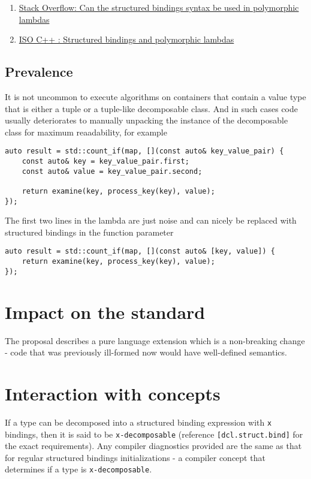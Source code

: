 \documentclass{article}
\begin{document}
\begin{enumerate}
    \item \href{https://stackoverflow.com/questions/45541334}{Stack Overflow:
        Can the structured bindings syntax be used in polymorphic lambdas}
    \item \href{https://goo.gl/fRSwNg}{ISO C++ : Structured bindings and
        polymorphic lambdas}
\end{enumerate}

\subsection{Prevalence}
It is not uncommon to execute algorithms on containers that contain a value
type that is either a tuple or a tuple-like decomposable class.  And in such
cases code usually deteriorates to manually unpacking the instance of the
decomposable class for maximum reaadability, for example

\begin{lstlisting}
auto result = std::count_if(map, [](const auto& key_value_pair) {
    const auto& key = key_value_pair.first;
    const auto& value = key_value_pair.second;

    return examine(key, process_key(key), value);
});
\end{lstlisting}

The first two lines in the lambda are just noise and can nicely be replaced
with structured bindings in the function parameter

\begin{lstlisting}
auto result = std::count_if(map, [](const auto& [key, value]) {
    return examine(key, process_key(key), value);
});
\end{lstlisting}


\section{Impact on the standard}
The proposal describes a pure language extension which is a non-breaking
change - code that was previously ill-formed now would have well-defined
semantics.


\section{Interaction with concepts}
If a type can be decomposed into a structured binding expression with
\texttt{x} bindings, then it is said to be \texttt{x-decomposable} (reference
\texttt{[dcl.struct.bind]} for the exact requirements).  Any compiler
diagnostics provided are the same as that for regular structured bindings
initializations - a compiler concept that determines if a type is
\texttt{x-decomposable}.
\end{document}
